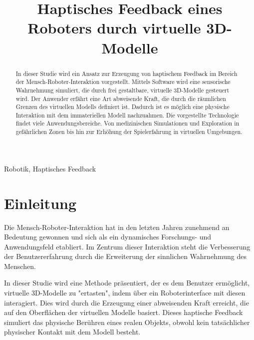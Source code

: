 \documentclass[conference]{IEEEtran}
\begin{document}
\title{Haptisches Feedback eines Roboters durch virtuelle 3D-Modelle}

\author{
    \and
}
\maketitle

\begin{abstract}
In dieser Studie wird ein Ansatz zur Erzeugung von haptischem Feedback im Bereich der 
Mensch-Roboter-Interaktion vorgestellt. 
Mittels Software wird eine sensorische Wahrnehmung simuliert, die durch frei gestaltbare, 
virtuelle 3D-Modelle gesteuert wird. Der Anwender erfährt eine Art abweisende Kraft, die durch die räumlichen 
Grenzen des virtuellen Modells definiert ist. Dadurch ist es möglich eine physische Interaktion mit dem immateriellen Modell 
nachzuahmen. Die vorgestellte Technologie findet viele Anwendungsbereiche. Von medizinischen 
Simulationen und Exploration in gefährlichen Zonen bis hin zur Erhöhung der Spielerfahrung in virtuellen Umgebungen.  

\end{abstract}

\begin{IEEEkeywords}
    Robotik, Haptisches Feedback 
\end{IEEEkeywords}

\section{Einleitung}
Die Mensch-Roboter-Interaktion hat in den letzten Jahren zunehmend an Bedeutung gewonnen und sich als ein 
dynamisches Forschungs- und Anwendungsfeld etabliert. Im Zentrum dieser Interaktion steht die Verbesserung 
der Benutzererfahrung durch die Erweiterung der sinnlichen Wahrnehmung des Menschen.

In dieser Studie wird eine Methode präsentiert, der es dem Benutzer ermöglicht, virtuelle 3D-Modelle zu 
"ertasten", indem über ein Roboterinterface mit diesen interagiert. Dies wird durch die Erzeugung einer 
abweisenden Kraft erreicht, die auf den Oberflächen der virtuellen Modelle basiert. Dieses haptische 
Feedback simuliert das physische Berühren eines realen Objekts, obwohl kein tatsächlicher physischer 
Kontakt mit dem Modell besteht. 
\end{document}
